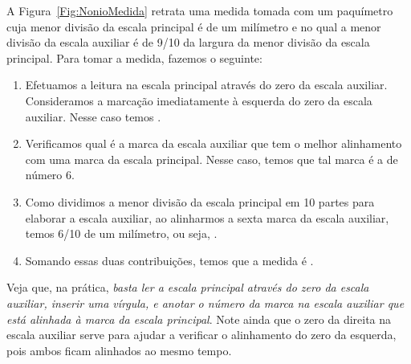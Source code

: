 A Figura~\ref{Fig:NonioMedida} retrata uma medida tomada com um paquímetro cuja menor divisão da escala principal é de um milímetro e no qual a menor divisão da escala auxiliar é de 9/10 da largura da menor divisão da escala principal. Para tomar a medida, fazemos o seguinte:
%
\begin{marginfigure}
\centering
{}
\caption{Exemplo de medida em um equipamento dotado de escala auxiliar.\label{Fig:NonioMedida}}
\end{marginfigure}
%
\begin{enumerate}
	\item Efetuamos a leitura na escala principal através do zero da escala auxiliar. Consideramos a marcação imediatamente à esquerda do zero da escala auxiliar. Nesse caso temos .
	\item Verificamos qual é a marca da escala auxiliar que tem o melhor alinhamento com uma marca da escala principal. Nesse caso, temos que tal marca é a de número 6.
	\item Como dividimos a menor divisão da escala principal em 10 partes para elaborar a escala auxiliar, ao alinharmos a sexta marca da escala auxiliar, temos 6/10 de um milímetro, ou seja, .
	\item Somando essas duas contribuições, temos que a medida é .
\end{enumerate}
%
Veja que, na prática, \emph{basta ler a escala principal através do zero da escala auxiliar, inserir uma vírgula, e anotar o número da marca na escala auxiliar que está alinhada à marca da escala principal}. Note ainda que o zero da direita na escala auxiliar serve para ajudar a verificar o alinhamento do zero da esquerda, pois ambos ficam alinhados ao mesmo tempo.

